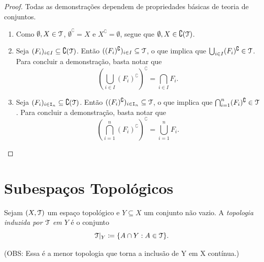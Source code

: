 \begin{proof} Todas as demonstrações dependem de propriedades básicas de teoria de conjuntos.
	\begin{enumerate}
	\item Como $\emptyset,X \in \mathcal{T}$, $\emptyset^\complement = X$ e $X^\complement = \emptyset$, segue que $\emptyset,X \in \complement (\mathcal{T})$.
	
	\item  Seja $(F_i)_{i \in I} \subseteq \complement (\mathcal{T})$. Então $((F_i)^\complement)_{i \in I} \subseteq \mathcal{T}$, o que implica que $\bigcup_{i \in I} (F_i)^\complement \in \mathcal{T}$. Para concluir a demonstração, basta notar que
	\begin{equation*}
	\left( \bigcup_{i \in I} (F_i)^\complement \right)^\complement = \bigcap_{i \in I} F_i.
	\end{equation*}
	
	\item Seja $(F_i)_{i \in \mathtt I_n} \subseteq \complement (\mathcal{T})$. Então $((F_i)^\complement)_{i \in \mathtt I_n} \subseteq \mathcal{T}$, o que implica que $\bigcap_{i=1}^n (F_i)^\complement \in \mathcal{T}$. Para concluir a demonstração, basta notar que
	\begin{equation*}
	\left( \bigcap_{i=1}^n (F_i)^\complement \right)^\complement = \bigcup_{i=1}^n F_i.
	\end{equation*}
\qedhere
	\end{enumerate}
\end{proof}

\section{Subespaços Topológicos}

\begin{defi}
	Sejam $(X,\mathcal{T})$ um espaço topológico e $Y \subseteq X$ um conjunto não vazio. A \emph{topologia induzida por $\mathcal{T}$ em $Y$} é o conjunto
	\begin{equation*}
	\topo|_Y \coloneqq \{A \cap Y : A \in \topo\}.
	\end{equation*}
\end{defi}

(OBS: Essa é a menor topologia que torna a inclusão de Y em X contínua.)

